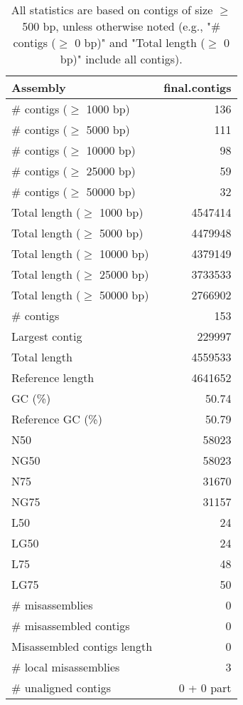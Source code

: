 \documentclass[12pt,a4paper]{article}
\begin{document}
\begin{table}[ht]
\begin{center}
\caption{All statistics are based on contigs of size $\geq$ 500 bp, unless otherwise noted (e.g., "\# contigs ($\geq$ 0 bp)" and "Total length ($\geq$ 0 bp)" include all contigs).}
\begin{tabular}{|l*{1}{|r}|}
\hline
Assembly & final.contigs \\ \hline
\# contigs ($\geq$ 1000 bp) & 136 \\ \hline
\# contigs ($\geq$ 5000 bp) & 111 \\ \hline
\# contigs ($\geq$ 10000 bp) & 98 \\ \hline
\# contigs ($\geq$ 25000 bp) & 59 \\ \hline
\# contigs ($\geq$ 50000 bp) & 32 \\ \hline
Total length ($\geq$ 1000 bp) & 4547414 \\ \hline
Total length ($\geq$ 5000 bp) & 4479948 \\ \hline
Total length ($\geq$ 10000 bp) & 4379149 \\ \hline
Total length ($\geq$ 25000 bp) & 3733533 \\ \hline
Total length ($\geq$ 50000 bp) & 2766902 \\ \hline
\# contigs & 153 \\ \hline
Largest contig & 229997 \\ \hline
Total length & 4559533 \\ \hline
Reference length & 4641652 \\ \hline
GC (\%) & 50.74 \\ \hline
Reference GC (\%) & 50.79 \\ \hline
N50 & 58023 \\ \hline
NG50 & 58023 \\ \hline
N75 & 31670 \\ \hline
NG75 & 31157 \\ \hline
L50 & 24 \\ \hline
LG50 & 24 \\ \hline
L75 & 48 \\ \hline
LG75 & 50 \\ \hline
\# misassemblies & 0 \\ \hline
\# misassembled contigs & 0 \\ \hline
Misassembled contigs length & 0 \\ \hline
\# local misassemblies & 3 \\ \hline
\# unaligned contigs & 0 + 0 part \\ \hline

\end{tabular}
\end{center}
\end{table}
\end{document}
